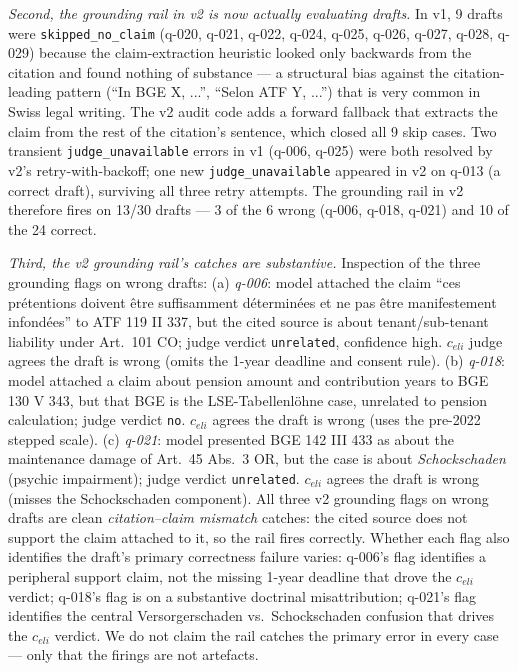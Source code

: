 \documentclass[11pt,a4paper]{article}
\begin{document}
\emph{Second, the grounding rail in v2 is now actually
evaluating drafts.}  In v1, 9 drafts were
\texttt{skipped\_no\_claim} (q-020, q-021, q-022, q-024,
q-025, q-026, q-027, q-028, q-029) because the
claim-extraction heuristic looked only backwards from the
citation and found nothing of substance --- a structural
bias against the citation-leading pattern (``In BGE X,
...'', ``Selon ATF Y, ...'') that is very common in Swiss
legal writing.  The v2 audit code adds a forward fallback
that extracts the claim from the rest of the citation's
sentence, which closed all 9 skip cases.  Two transient
\texttt{judge\_unavailable} errors in v1 (q-006, q-025) were
both resolved by v2's retry-with-backoff; one new
\texttt{judge\_unavailable} appeared in v2 on q-013 (a
correct draft), surviving all three retry attempts.  The
grounding rail in v2 therefore fires on 13/30 drafts ---
3 of the 6 wrong (q-006, q-018, q-021) and 10 of the 24
correct.

\emph{Third, the v2 grounding rail's catches are
substantive.}  Inspection of the three grounding flags on
wrong drafts:
(a) \emph{q-006}: model attached the claim ``ces
pr\'etentions doivent \^etre suffisamment d\'etermin\'ees et
ne pas \^etre manifestement infond\'ees'' to ATF 119 II 337,
but the cited source is about tenant/sub-tenant liability
under Art.~101 CO; judge verdict \texttt{unrelated},
confidence high.  $c_{eli}$ judge agrees the draft is wrong
(omits the 1-year deadline and consent rule).
(b) \emph{q-018}: model attached a claim about pension
amount and contribution years to BGE 130 V 343, but that BGE
is the LSE-Tabellenl\"ohne case, unrelated to pension
calculation; judge verdict \texttt{no}.  $c_{eli}$ agrees
the draft is wrong (uses the pre-2022 stepped scale).
(c) \emph{q-021}: model presented BGE 142 III 433 as
about the maintenance damage of Art.~45 Abs.~3 OR, but the
case is about \emph{Schockschaden} (psychic impairment); judge
verdict \texttt{unrelated}.  $c_{eli}$ agrees the draft is
wrong (misses the Schockschaden component).
All three v2 grounding flags on wrong drafts are clean
\emph{citation--claim mismatch} catches: the cited source
does not support the claim attached to it, so the rail
fires correctly.  Whether each flag also identifies the
draft's primary correctness failure varies: q-006's flag
identifies a peripheral support claim, not the missing
1-year deadline that drove the $c_{eli}$ verdict; q-018's
flag is on a substantive doctrinal misattribution; q-021's
flag identifies the central Versorgerschaden vs.\
Schockschaden confusion that drives the $c_{eli}$ verdict.
We do not claim the rail catches the primary error in
every case --- only that the firings are not artefacts.
\end{document}
